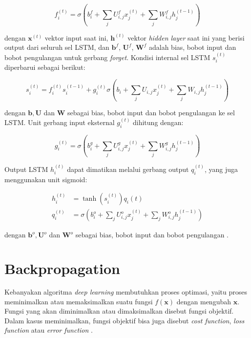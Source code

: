 \begin{equation}
    f_{i}^{(t)} = \sigma\left(b_{i}^{f} + \sum_{j} U_{i,j}^{f} x_{j}^{(t)} + \sum_{j} W_{i,j}^{f} h_{j}^{(t-1)}\right)
\end{equation}

\noindent
dengan $\pmb{x}^{(t)}$ vektor input saat ini, $\pmb{h}^{(t)}$ vektor \textit{hidden layer} saat ini yang berisi output dari seluruh sel LSTM, dan $\pmb{b}^{f}$, $\pmb{U}^{f}$, $\pmb{W}^{f}$ adalah bias, bobot input dan bobot pengulangan untuk gerbang \textit{forget}. Kondisi internal sel LSTM $s_{i}^{(t)}$ diperbarui sebagai berikut:

\begin{equation}
    s_{i}^{(t)} = f_{i}^{(t)}  s_{i}^{(t-1)} + g_{i}^{(t)} \sigma\left(b_{i} + \sum_{j} U_{i,j} x_{j}^{(t)} + \sum_{j} W_{i,j} h_{j}^{(t-1)} \right)
\end{equation}

\noindent
dengan $\pmb{b}, \pmb{U}$ dan $\pmb{W}$ sebagai bias, bobot input dan bobot pengulangan ke sel LSTM\@. Unit gerbang input eksternal $g_{i}^{(t)}$ dihitung dengan:

\begin{equation}
    g_{i}^{(t)} = \sigma\left(b_{i}^{g} + \sum_{j} U_{i,j}^{g} x_{j}^{(t)} + \sum_{j} W_{i,j}^{g} h_{j}^{(t-1)}\right)
\end{equation}

Output LSTM $h_{i}^{(t)}$ dapat dimatikan melalui gerbang output $q_{i}^{(t)}$, yang juga menggunakan unit sigmoid:

\begin{align}
    \label{eq:output-lstm}
    h_{i}^{(t)} &= \tanh\left(s_{i}^{(t)}\right) q_{i}{(t)} \\
    q_{i}^{(t)} &= \sigma\left(b_{i}^{o} + \sum_{j} U_{i,j}^{o} x_{j}^{(t)} + \sum_{j} W_{i,j}^{o} h_{j}^{(t-1)} \right)
\end{align}

\noindent
dengan $\pmb{b}^{o}, \pmb{U}^{o}$ dan $\pmb{W}^{o}$ sebagai bias, bobot input dan bobot pengulangan \citep{goodfellow-2016}.



\section{Backpropagation}
Kebanyakan algoritma \textit{deep learning} membutuhkan proses optimasi, yaitu proses meminimalkan atau memaksimalkan suatu fungsi $f(\pmb{x})$ dengan mengubah $\pmb{x}$. Fungsi yang akan diminimalkan atau dimaksimalkan disebut fungsi objektif. Dalam kasus meminimalkan, fungsi objektif bisa juga disebut \textit{cost function}, \textit{loss function} atau \textit{error function} \citep{goodfellow-2016}.

